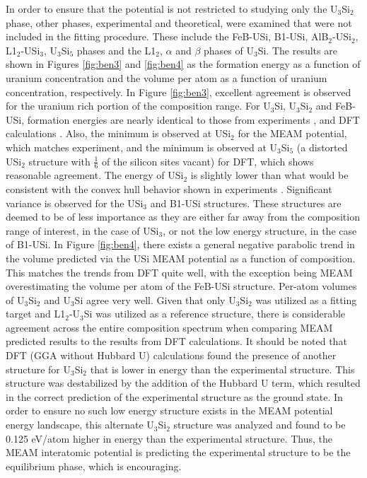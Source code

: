 \documentclass[review]{elsarticle}
\begin{document}
In order to ensure that the potential is not restricted to studying only the U$_{3}$Si$_{2}$ phase, other phases, experimental and theoretical, were examined that were not included in the fitting procedure.  These include the FeB-USi, B1-USi, AlB$_{2}$-USi$_{2}$, L1$_{2}$-USi$_{3}$, U$_{3}$Si$_{5}$ phases and the L1$_{2}$, $\alpha$ and $\beta$ phases of U$_{3}$Si.  The results are shown in Figures \ref{fig:ben3} and \ref{fig:ben4} as the formation energy as a function of uranium concentration and the volume per atom as a function of uranium concentration, respectively.  In Figure \ref{fig:ben3}, excellent agreement is observed for the uranium rich portion of the composition range.  For U$_{3}$Si, U$_{3}$Si$_{2}$ and FeB-USi, formation energies are nearly identical to those from experiments \cite{berche2009}, and DFT calculations \cite{noordhoek2016}.  Also, the minimum is observed at USi$_{2}$ for the MEAM potential, which matches experiment, and the minimum is observed at U$_{3}$Si$_{5}$ (a distorted USi$_{2}$ structure with $\frac{1}{6}$ of the silicon sites vacant) for DFT, which shows reasonable agreement.  The energy of USi$_{2}$ is slightly lower than what would be consistent with the convex hull behavior shown in experiments \cite{berche2009}.  Significant variance is observed for the USi$_{3}$ and B1-USi structures.  These structures are deemed to be of less importance as they are either far away from the composition range of interest, in the case of USi$_{3}$, or not the low energy structure, in the case of B1-USi.  In Figure \ref{fig:ben4}, there exists a general negative parabolic trend in the volume predicted via the USi MEAM potential as a function of composition.  This matches the trends from DFT quite well, with the exception being MEAM overestimating the volume per atom of the FeB-USi structure.  Per-atom volumes of U$_{3}$Si$_{2}$ and U$_{3}$Si agree very well.  Given that only U$_{3}$Si$_{2}$ was utilized as a fitting target and L1$_{2}$-U$_{3}$Si was utilized as a reference structure, there is considerable agreement across the entire composition spectrum when comparing MEAM predicted results to the results from DFT calculations.  It should be noted that DFT (GGA without Hubbard U) calculations \cite{noordhoek2016} found the presence of another structure for U$_{3}$Si$_{2}$ that is lower in energy than the experimental structure.  This structure was destabilized by the addition of the Hubbard U term, which resulted in the correct prediction of the experimental structure as the ground state.  In order to ensure no such low energy structure exists in the MEAM potential energy landscape, this alternate U$_{3}$Si$_{2}$ structure was analyzed and found to be 0.125 eV/atom higher in energy than the experimental structure.  Thus, the MEAM interatomic potential is predicting the experimental structure to be the equilibrium phase, which is encouraging.
\end{document}

